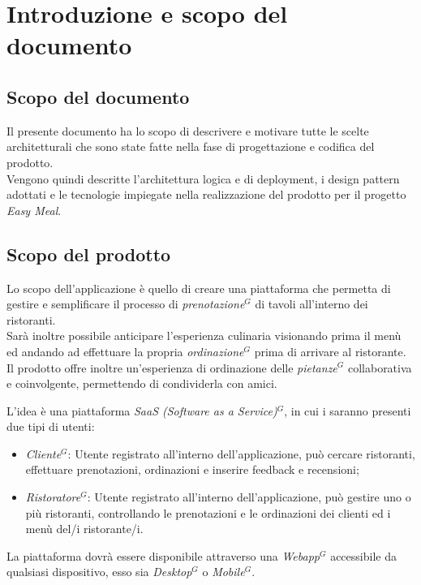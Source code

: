 \nonstopmode
\section{Introduzione e scopo del documento}

    \subsection{Scopo del documento}

    Il presente documento ha lo scopo di descrivere e motivare tutte le scelte architetturali che sono state fatte nella fase di progettazione e codifica del prodotto.\\
    Vengono quindi descritte l'architettura logica e di deployment, i design pattern adottati e le tecnologie impiegate nella realizzazione del prodotto per il progetto \textit{Easy Meal}.
    \subsection{Scopo del prodotto}

    Lo scopo dell’applicazione è quello di creare una piattaforma che permetta di gestire e semplificare il processo di \emph{prenotazione}$^{G}$ di tavoli all’interno dei ristoranti. \\
    Sarà inoltre possibile anticipare l’esperienza culinaria visionando prima il menù ed andando ad effettuare la propria \emph{ordinazione}$^{G}$ prima di arrivare al ristorante. \\
    Il prodotto offre inoltre un’esperienza di ordinazione delle \emph{pietanze}$^{G}$ collaborativa e coinvolgente, permettendo di condividerla con amici.

    L’idea è una piattaforma \emph{SaaS (Software as a Service)}$^{G}$, in cui i saranno presenti due tipi di utenti:
    \begin{itemize}
      \item \emph{Cliente}$^{G}$: Utente registrato all’interno dell’applicazione, può cercare ristoranti, effettuare prenotazioni, ordinazioni e inserire feedback e recensioni;
      \item \emph{Ristoratore}$^{G}$: Utente registrato all’interno dell’applicazione, può gestire uno o più ristoranti, controllando le prenotazioni e le ordinazioni dei clienti ed i menù del/i ristorante/i.
    \end{itemize}


    La piattaforma dovrà essere disponibile attraverso una \emph{Webapp}$^{G}$ accessibile da qualsiasi dispositivo, esso sia \emph{Desktop}$^{G}$ o \emph{Mobile}$^{G}$.


